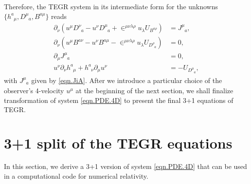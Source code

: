 \documentclass[
10pt, %
a4paper, %
oneside, %
twocolumn,
headinclude,footinclude, %
BCOR5mm, %
]{scrartcl}
\newcommand{\IP}[1]{{\color{Red}[IP:\ \ #1]}}
\newcommand{\pd}[1]{\partial_{#1}}
\newcommand{\tetrsymbol}{h}
\newcommand{\tetr}[2]{\tetrsymbol^{#1}_{\phantom{#1}#2}}
\newcommand{\D}[1]{\partial_{#1}} %
\newcommand{\Dm}[2]{D_{\phantom{#2}#1}^{#2}}	%
\newcommand{\Bm}[2]{B^{#1#2}}	%
\newcommand{\w}[2]{W^{#1}_{\phantom{#1}#2}}
\newcommand{\Um}{U}%
\newcommand{\EMmat}[2]{\sigma^{#1}_{\ \,#2}}
\newcommand{\LCsymb}{\bm{\in}}    %
\newcommand{\KD}[2]{\delta^{#1}_{\ #2}}
\newcommand{\NC}[2]{J^{#2}_{\phantom{#2}#1}}
\begin{document}
	Therefore, the TEGR system in its intermediate form for the 
	unknowns $ \{\tetr{a}{\mu},\Dm{a}{\mu},\Bm{a}{\mu}\} $  reads
	\begin{subequations}\label{eqn.PDE.4D}
		\begin{align}%
			\D{\nu}(u^\mu\Dm{a}{\nu} - u^\nu \Dm{a}{\mu} + 
			\LCsymb^{\mu\nu\lambda\rho}u_\lambda 
			\Um_{\Bm{a}{\rho}})
			& =	\NC{a}{\mu},\label{eT}\\[2mm]
			\D{\nu}(u^\mu \Bm{a}{\nu} - u^\nu \Bm{a}{\mu} - 
			\LCsymb^{\mu\nu\lambda\rho}u_\lambda 
			\Um_{\Dm{a}{\rho}}) 
			& = 0,\label{bT}\\[2mm]
			\pd{\mu}\NC{a}{\mu}
			& = 0, \\[2mm] 
			u^\nu\D{\nu}\tetr{a}{\mu} + \tetr{a}{\nu}\D{\mu}u^\nu &=-\Um_{\Dm{a}{\mu}},
			\label{tetr}
		\end{align}
	\end{subequations}
	with $ \NC{a}{\mu} $ given by \eqref{eqn.JiA}. After we introduce a particular choice of the 
	observer's 4-velocity $ u^\mu $ at the beginning of the next section, we shall finalize 
	transformation of 
	system \eqref{eqn.PDE.4D} to 
	present the final 3+1 equations of TEGR.
	
	
	
	
	\section{3+1 split of the TEGR equations}	\label{sec.31}
	
	
	In this section, we derive a 3+1 version of system \eqref{eqn.PDE.4D} that can be used in a 
	computational code for numerical relativity.
	
\end{document}
